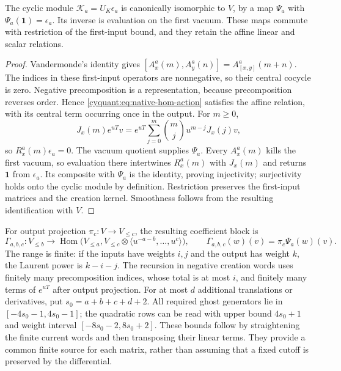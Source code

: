 \begin{proposition}\label{cyquant:prop:classical-adjunction}
The cyclic module $\mathscr K_a=U_K\epsilon_a$ is canonically
isomorphic to $V$, by a map $\Psi_a$ with
$\Psi_a(\mathbf1)=\epsilon_a$.  Its inverse is evaluation on the
first vacuum.  These maps commute with restriction of the first-input
bound, and they retain the affine linear and scalar relations.
\end{proposition}

\begin{proof}
Vandermonde's identity gives
$[A_x^a(m),A_y^a(n)]=A_{[x,y]}^a(m+n)$.
The indices in these first-input operators are nonnegative, so their
central cocycle is zero.  Negative precomposition is a representation,
because precomposition reverses order.  Hence
\eqref{cyquant:eq:native-hom-action} satisfies the affine relation,
with its central term occurring once in the output.
For $m\geq0$,
\[
 J_x(m)e^{uT}v=e^{uT}\sum_{j=0}^m\binom mj u^{m-j}J_x(j)v,
\]
so $R_x^a(m)\epsilon_a=0$.  The vacuum quotient supplies $\Psi_a$.
Every $A_x^a(m)$ kills the first vacuum, so evaluation there intertwines
$R_x^a(m)$ with $J_x(m)$ and returns $\mathbf1$ from $\epsilon_a$.
Its composite with $\Psi_a$ is the identity, proving injectivity;
surjectivity holds onto the cyclic module by definition.
Restriction preserves the first-input matrices and the creation kernel.
Smoothness follows from the resulting identification with $V$.
\end{proof}

For output projection $\pi_c:V\to V_{\leq c}$, the resulting
coefficient block is
\[
 \Gamma_{a,b,c}:V_{\leq b}\longrightarrow
 \operatorname{Hom}\bigl(V_{\leq a},
       V_{\leq c}\otimes\langle u^{-a-b},\ldots,u^c\rangle\bigr),
 \qquad \Gamma_{a,b,c}(w)(v)=\pi_c\Psi_a(w)(v).
\]
The range is finite: if the inputs have weights $i,j$ and the output
has weight $k$, the Laurent power is $k-i-j$.
The recursion in negative creation words uses finitely many
precomposition indices, whose total is at most $i$, and finitely many
terms of $e^{uT}$ after output projection.
For at most $d$ additional translations or derivatives, put
$s_0=a+b+c+d+2$.  All required ghost generators lie in
$[-4s_0-1,4s_0-1]$; the quadratic rows can be read with upper bound
$4s_0+1$ and weight interval $[-8s_0-2,8s_0+2]$.
These bounds follow by straightening the finite current words and
then transposing their linear terms.  They provide a common finite
source for each matrix, rather than assuming that a fixed cutoff is
preserved by the differential.

